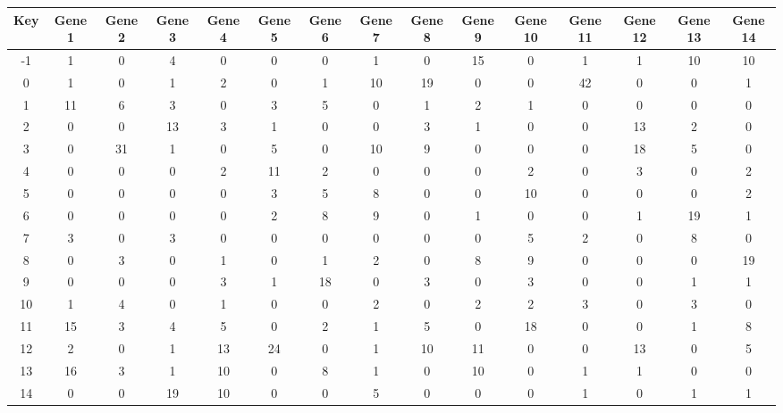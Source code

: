 \begin{tabular}{|c|c|c|c|c|c|c|c|c|c|c|c|c|c|c|}
\hline
Key & Gene 1 & Gene 2 & Gene 3 & Gene 4 & Gene 5 & Gene 6 & Gene 7 & Gene 8 & Gene 9 & Gene 10 & Gene 11 & Gene 12 & Gene 13 & Gene 14 \\
\hline
-1 & 1 & 0 & 4 & 0 & 0 & 0 & 1 & 0 & 15 & 0 & 1 & 1 & 10 & 10 \\
0 & 1 & 0 & 1 & 2 & 0 & 1 & 10 & 19 & 0 & 0 & 42 & 0 & 0 & 1 \\
1 & 11 & 6 & 3 & 0 & 3 & 5 & 0 & 1 & 2 & 1 & 0 & 0 & 0 & 0 \\
2 & 0 & 0 & 13 & 3 & 1 & 0 & 0 & 3 & 1 & 0 & 0 & 13 & 2 & 0 \\
3 & 0 & 31 & 1 & 0 & 5 & 0 & 10 & 9 & 0 & 0 & 0 & 18 & 5 & 0 \\
4 & 0 & 0 & 0 & 2 & 11 & 2 & 0 & 0 & 0 & 2 & 0 & 3 & 0 & 2 \\
5 & 0 & 0 & 0 & 0 & 3 & 5 & 8 & 0 & 0 & 10 & 0 & 0 & 0 & 2 \\
6 & 0 & 0 & 0 & 0 & 2 & 8 & 9 & 0 & 1 & 0 & 0 & 1 & 19 & 1 \\
7 & 3 & 0 & 3 & 0 & 0 & 0 & 0 & 0 & 0 & 5 & 2 & 0 & 8 & 0 \\
8 & 0 & 3 & 0 & 1 & 0 & 1 & 2 & 0 & 8 & 9 & 0 & 0 & 0 & 19 \\
9 & 0 & 0 & 0 & 3 & 1 & 18 & 0 & 3 & 0 & 3 & 0 & 0 & 1 & 1 \\
10 & 1 & 4 & 0 & 1 & 0 & 0 & 2 & 0 & 2 & 2 & 3 & 0 & 3 & 0 \\
11 & 15 & 3 & 4 & 5 & 0 & 2 & 1 & 5 & 0 & 18 & 0 & 0 & 1 & 8 \\
12 & 2 & 0 & 1 & 13 & 24 & 0 & 1 & 10 & 11 & 0 & 0 & 13 & 0 & 5 \\
13 & 16 & 3 & 1 & 10 & 0 & 8 & 1 & 0 & 10 & 0 & 1 & 1 & 0 & 0 \\
14 & 0 & 0 & 19 & 10 & 0 & 0 & 5 & 0 & 0 & 0 & 1 & 0 & 1 & 1 \\
\hline
\end{tabular}